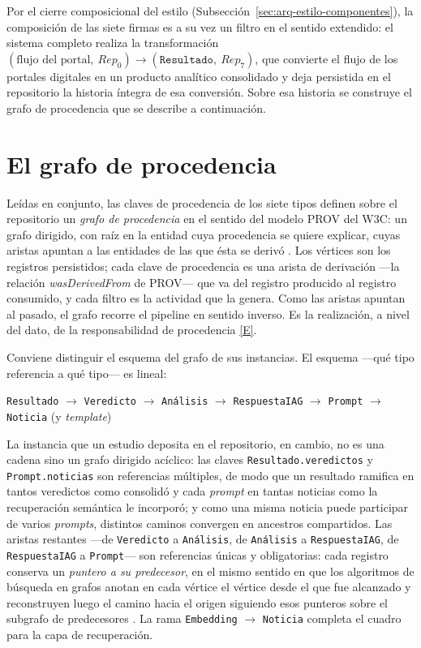 \documentclass[12pt]{report}
\DeclareRobustCommand{\resp}[1]{\hyperref[tab:registro-responsabilidades]{\textcolor{respcolor}{[#1]}}}
\begin{document}
Por el cierre composicional del estilo (Subsección~\ref{sec:arq-estilo-componentes}), la composición de las siete firmas es a su vez un filtro en el sentido extendido: el sistema completo realiza la transformación \((\text{flujo del portal},\ \mathit{Rep}_0) \to (\texttt{Resultado},\ \mathit{Rep}_7)\), que convierte el flujo de los portales digitales en un producto analítico consolidado y deja persistida en el repositorio la historia íntegra de esa conversión. Sobre esa historia se construye el grafo de procedencia que se describe a continuación.

\section{El grafo de procedencia}
\label{anexo:tipos-procedencia}

Leídas en conjunto, las claves de procedencia de los siete tipos definen sobre el repositorio un \textit{grafo de procedencia} en el sentido del modelo PROV del W3C: un grafo dirigido, con raíz en la entidad cuya procedencia se quiere explicar, cuyas aristas apuntan a las entidades de las que ésta se derivó \citep{provdm:2013}. Los vértices son los registros persistidos; cada clave de procedencia es una arista de derivación ---la relación \textit{wasDerivedFrom} de PROV--- que va del registro producido al registro consumido, y cada filtro es la actividad que la genera. Como las aristas apuntan al pasado, el grafo recorre el pipeline en sentido inverso. Es la realización, a nivel del dato, de la responsabilidad de procedencia \resp{E}.

Conviene distinguir el esquema del grafo de sus instancias. El esquema ---qué tipo referencia a qué tipo--- es lineal:

\begin{center}
  \texttt{Resultado} \(\to\) \texttt{Veredicto} \(\to\) \texttt{Análisis} \(\to\) \texttt{RespuestaIAG} \(\to\) \texttt{Prompt} \(\to\) \texttt{Noticia} (y \textit{template})
\end{center}

La instancia que un estudio deposita en el repositorio, en cambio, no es una cadena sino un grafo dirigido acíclico: las claves \texttt{Resultado.veredictos} y \texttt{Prompt.noticias} son referencias múltiples, de modo que un resultado ramifica en tantos veredictos como consolidó y cada \textit{prompt} en tantas noticias como la recuperación semántica le incorporó; y como una misma noticia puede participar de varios \textit{prompts}, distintos caminos convergen en ancestros compartidos. Las aristas restantes ---de \texttt{Veredicto} a \texttt{Análisis}, de \texttt{Análisis} a \texttt{RespuestaIAG}, de \texttt{RespuestaIAG} a \texttt{Prompt}--- son referencias únicas y obligatorias: cada registro conserva un \textit{puntero a su predecesor}, en el mismo sentido en que los algoritmos de búsqueda en grafos anotan en cada vértice el vértice desde el que fue alcanzado y reconstruyen luego el camino hacia el origen siguiendo esos punteros sobre el subgrafo de predecesores \citep[\S22.2]{cormen:2009}. La rama \texttt{Embedding} \(\to\) \texttt{Noticia} completa el cuadro para la capa de recuperación.
\end{document}
